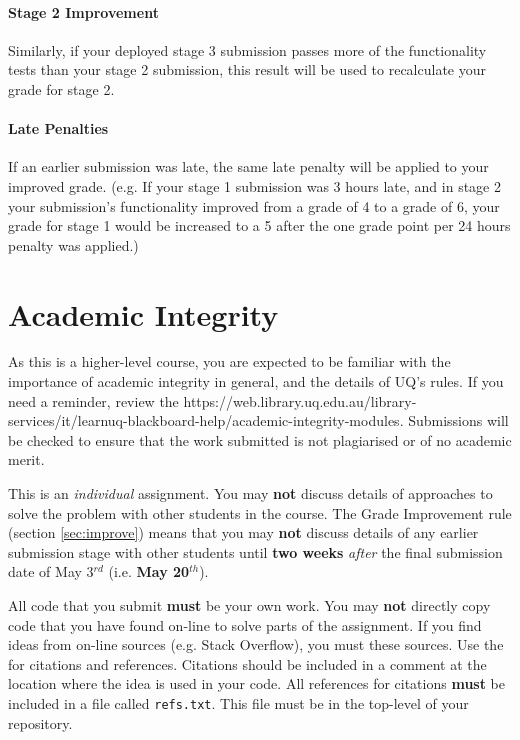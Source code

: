 \documentclass{csse4400}
\begin{document}
\paragraph{Stage 2 Improvement}
Similarly, if your deployed stage 3 submission passes more of the functionality tests than your stage 2 submission, this result will be used to recalculate your grade for stage 2.

\paragraph{Late Penalties}
If an earlier submission was late, the same late penalty will be applied to your improved grade.
(e.g. If your stage 1 submission was 3 hours late, and in stage 2 your submission's functionality improved from a grade of 4 to a grade of 6,
your grade for stage 1 would be increased to a 5 after the one grade point per 24 hours penalty was applied.)

\section{Academic Integrity}
As this is a higher-level course, you are expected to be familiar with the importance of academic integrity in general, and the details of UQ's rules.
If you need a reminder, review the  {https://web.library.uq.edu.au/library-services/it/learnuq-blackboard-help/academic-integrity-modules}.
Submissions will be checked to ensure that the work submitted is not plagiarised or of no academic merit.

This is an \textit{individual} assignment. You may \textbf{not} discuss details of approaches to solve the problem with other students in the course.
The Grade Improvement rule (section \ref{sec:improve}) means that you may \textbf{not} discuss details of any earlier submission stage with other students
until \textbf{two weeks} \textit{after} the final submission date of May 3$^{rd}$ (i.e. \textbf{May 20$^{th}$}).

All code that you submit \textbf{must} be your own work. You may \textbf{not} directly copy code that you have found on-line to solve parts of the assignment. If you find ideas from on-line sources (e.g. Stack Overflow), you must  these sources. Use the  for citations and references. Citations should be included in a comment at the location where the idea is used in your code. All references for citations \textbf{must} be included in a file called \texttt{refs.txt}. This file must be in the top-level of your repository.
\end{document}
